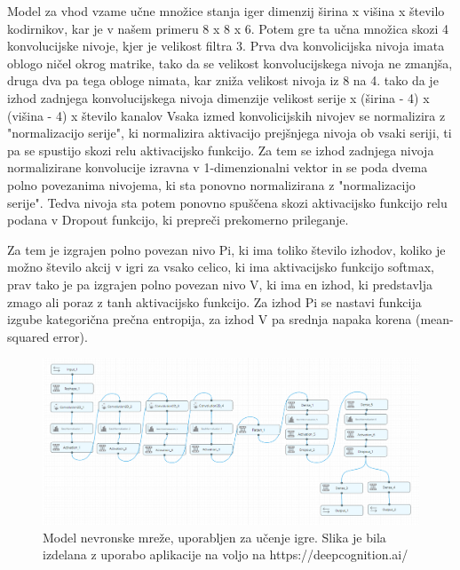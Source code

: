 \documentclass[a4paper, 12pt]{book}
\begin{document}
Model za vhod vzame učne množice stanja iger dimenzij širina x višina x število kodirnikov, kar je v našem primeru 8 x 8 x 6.
Potem gre ta učna množica skozi 4 konvolucijske nivoje, kjer je velikost filtra 3.
Prva dva konvolicijska nivoja imata oblogo ničel okrog matrike, tako da se velikost konvolucijskega nivoja ne zmanjša, druga dva pa tega obloge nimata, kar zniža velikost nivoja iz 8 na 4.
tako da je izhod zadnjega konvolucijskega nivoja dimenzije velikost serije  x (širina - 4) x (višina - 4) x število kanalov
Vsaka izmed konvolicijskih nivojev se normalizira z "normalizacijo serije", ki normalizira aktivacijo prejšnjega nivoja ob vsaki seriji, ti pa se spustijo skozi relu aktivacijsko funkcijo.
Za tem se izhod zadnjega nivoja normalizirane konvolucije izravna v 1-dimenzionalni vektor in se poda dvema polno povezanima nivojema, ki sta ponovno normalizirana z "normalizacijo serije".
Tedva nivoja sta potem ponovno spuščena skozi aktivacijsko funkcijo relu podana v  Dropout funkcijo, ki prepreči prekomerno prileganje.

Za tem je izgrajen polno povezan nivo Pi, ki ima toliko število izhodov, koliko je možno število akcij v igri za vsako celico, ki ima aktivacijsko funkcijo softmax,
prav tako je pa izgrajen polno povezan nivo V, ki ima en izhod, ki predstavlja zmago ali poraz z tanh aktivacijsko funkcijo.
Za izhod Pi se nastavi funkcija izgube kategorična prečna entropija, za izhod V pa srednja napaka korena (mean-squared error).

\begin{figure}[h]
	\begin{center}
		\includegraphics[width=1\textwidth]{photos/model_using_deepcognition.pdf}
	\end{center}
	\caption{Model nevronske mreže, uporabljen za učenje igre. 
		Slika je bila izdelana z uporabo aplikacije na voljo na https://deepcognition.ai/}
	\label{vizualzacijaModela}
\end{figure}
\end{document}
